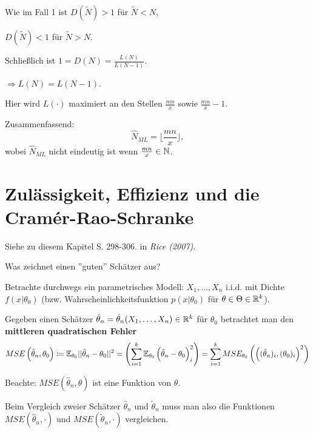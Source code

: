 \documentclass{tstextbook}
\begin{document}
\begin{example}
\begin{itemize}
		Wie im Fall 1 ist $ D(\tilde{N}) > 1 $ für $ \tilde{N} < N $, 
		
		$ D(\tilde{N}) < 1 $ für $ \tilde{N} > N $.
		
		Schließlich ist $ 1 = D(N) = \frac{L(N)}{L(N-1)} $.
		
		$ \Rightarrow L(N) = L(N-1) $. 
		
		Hier wird $ L(\cdot) $ maximiert an den Stellen $ \frac{mn}{x} $ sowie $ \frac{mn}{x} -1 $. 
	\end{itemize}

	Zusammenfassend: 
	\[
	\hat{N}_{ML} = \lfloor\frac{mn}{x}\rfloor,
	\]
	wobei $ \hat{N}_{ML} $ nicht eindeutig ist wenn $ \frac{mn}{x} \in \mathbb N $.
\end{example}


\section{Zulässigkeit, Effizienz und die Cramér-Rao-Schranke}

\begin{book}
	Siehe zu diesem Kapitel S. 298-306. in	\textit{Rice (2007)}.
\end{book}

Was zeichnet einen ''guten'' Schätzer aus?

Betrachte durchwegs ein parametrisches Modell:
$ X_1,\ldots,X_n $ i.i.d. mit Dichte $ f(x | \theta_0)$ (bzw. Wahrscheinlichkeitsfunktion $ p(x | \theta_0)$ für $\theta \in \Theta \in \mathbb R^k $).

Gegeben einen Schätzer $ \hat{\theta}_n = \hat{\theta}_n(X_1, \ldots, X_n) \in \mathbb R^k $ für $ \theta_0 $ betrachtet man den \textbf{mittleren quadratischen Fehler}  
	\[
	MSE\left(\hat{\theta}_n,\theta_0\right) \coloneqq \mathbb E_{\theta_0} ||\hat{\theta}_n-\theta_0||^2=\left(\sum_{i=1}^{k} \mathbb E_{\theta_0} \left(\hat{\theta}_n -\theta_{0}\right)_i ^2\right) = \sum_{i=1}^{k} MSE_{\theta_0}\left(\left((\hat{\theta}_n)_i , (\theta_{0})_i \right)^2\right)
	\]

\begin{remark}
	Beachte: $MSE(\hat{\theta}_n, \theta)$ ist eine Funktion von $\theta$.
	
\end{remark}

Beim Vergleich zweier Schätzer $\hat{\theta}_n$ und $\tilde{\theta}_n$ muss man also die Funktionen $MSE(\hat{\theta}_n, \cdot) $ und $ MSE(\tilde{\theta}_n, \cdot)$ vergleichen. 
\end{document}
